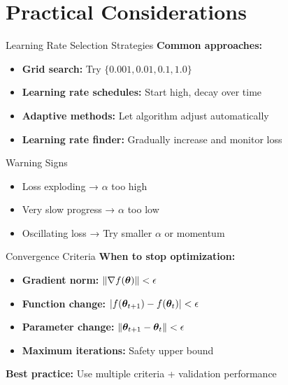 \documentclass[usenames,dvipsnames]{beamer}
\begin{document}
  \section{Practical Considerations}

  \begin{frame}{Learning Rate Selection Strategies}
    \textbf{Common approaches:}
    
    \begin{itemize}[<+->]
        \item \textbf{Grid search:} Try $\{0.001, 0.01, 0.1, 1.0\}$
        \item \textbf{Learning rate schedules:} Start high, decay over time
        \item \textbf{Adaptive methods:} Let algorithm adjust automatically
        \item \textbf{Learning rate finder:} Gradually increase and monitor loss
    \end{itemize}
    
    \pause
    \begin{alertbox}{Warning Signs}
    \begin{itemize}
        \item Loss exploding → $\alpha$ too high
        \item Very slow progress → $\alpha$ too low
        \item Oscillating loss → Try smaller $\alpha$ or momentum
    \end{itemize}
    \end{alertbox}
  \end{frame}

  \begin{frame}{Convergence Criteria}
    \textbf{When to stop optimization:}
    
    \begin{itemize}[<+->]
        \item \textbf{Gradient norm:} $\|\nabla f(\boldsymbol{\theta})\| < \epsilon$
        \item \textbf{Function change:} $|f(\boldsymbol{\theta}_{t+1}) - f(\boldsymbol{\theta}_t)| < \epsilon$
        \item \textbf{Parameter change:} $\|\boldsymbol{\theta}_{t+1} - \boldsymbol{\theta}_t\| < \epsilon$
        \item \textbf{Maximum iterations:} Safety upper bound
    \end{itemize}
    
    \pause
    \begin{keypointsbox}
    \textbf{Best practice:} Use multiple criteria + validation performance
    \end{keypointsbox}
  \end{frame}
\end{document}
